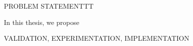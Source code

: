 \renewcommand{\sfdefault}{phv}
PROBLEM STATEMENTTT

In this thesis, we propose

VALIDATION, EXPERIMENTATION, IMPLEMENTATION

